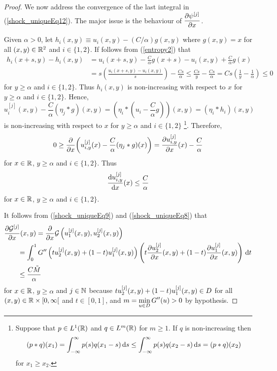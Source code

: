 \begin{proof}
 We now address the convergence of the last integral in
(\ref{shock_uniqueEq12}).  The major issue is the behaviour of
$\DS \pdydx{\psi^{[j]}}{x}$.

Given $\alpha > 0$, let $h_i(x,y) \equiv u_i(x,y) - (C/\alpha) g(x,y)$ where 
$g(x,y) = x$ for all $(x,y) \in \RR^2$ and $i \in\{1,2\}$.  If follows from
(\ref{entropy2}) that
\begin{align*}
h_i(x+s,y) - h_i(x,y)
&= u_i(x+s,y) - \frac{C}{\alpha} g(x+s)
- u_i(x,y) + \frac{C}{\alpha} g(x) \\
&= s\left( \frac{u_i(x+s,y) - u_i(x,y)}{s}\right) - \frac{C s}{\alpha}
\leq \frac{C s}{y} - \frac{C s}{\alpha}
= C s\left( \frac{1}{y} - \frac{1}{\alpha}\right) \leq 0
\end{align*}
for $y\geq \alpha$ and $i \in \{1,2\}$.  Thus $h_i(x,y)$ is non-increasing
with respect to $x$ for $y\geq \alpha$ and $i \in \{1,2\}$.  Hence,
\[
u_i^{[j]}(x,y) - \frac{C}{\alpha} (\eta_j \ast g)(x,y)
= \left(\eta_i \ast ( u_i- \frac{C}{\alpha} g)\right)(x,y)
= \left(\eta_i \ast h_i\right)(x,y)
\]
is non-increasing with respect to $x$ for $y \geq \alpha$ and
$i \in \{1,2\}$ \footnote{
Suppose that $p \in L^1(\RR)$ and $q \in L^m(\RR)$ for $m \geq 1$. 
If $q$ is non-increasing then
\[
(p\ast q)(x_1) = \int_{-\infty}^\infty p(s) q(x_1-s) \dx{s}
\leq \int_{-\infty}^\infty p(s) q(x_2-s) \dx{s}
= (p\ast q)(x_2)
\]
for $x_1 \geq x_2$.}.
Therefore,
\[
0 \geq \pdfdx{\left( u_{i,y}^{[j]}(x) - \frac{C}{\alpha} (\eta_j \ast g)(x)
\right)}{x}
= \pdydx{u_{i,y}^{[j]}}{x}(x) - \frac{C}{\alpha}
\]
for $x \in \RR$, $y\geq \alpha$ and $i \in \{1,2\}$.  Thus
\begin{equation} \label{shock_uniqueEq8}
 \dydx{u_{i,y}^{[j]}}{x}(x) \leq \frac{C}{\alpha}
\end{equation}
for $x \in \RR$, $y \geq \alpha$ and $i \in \{1,2\}$.

It follows from (\ref{shock_uniqueEq9}) and (\ref{shock_uniqueEq8}) that
\begin{align}
&\pdydx{{\cal G}^{[j]}}{x}(x,y)
= \pdfdx{ {\cal G}\left(u_1^{[j]}(x,y),u_2^{[j]}(x,y)\right)}{x} \nonumber \\
&\qquad
= \int_0^1 G''\left(t u_2^{[j]}(x,y) + (1-t) u_1^{[j]}(x,y)\right)
\left(t \pdydx{u_2^{[j]}}{x}(x,y) + (1-t) \pdydx{u_1^{[j]}}{x}(x,y) \right)
\dx{t} \nonumber \\
&\qquad \leq \frac{C \tilde{M}}{\alpha}   \label{shock_uniqueEq13}
\end{align}
for $x\in \RR$, $y \geq \alpha$ and $j\in \NN$ because
$\DS t u_2^{[j]}(x,y) + (1-t) u_1^{[j]}(x,y) \in D$
for all $(x,y) \in \RR \times[0,\infty[$ and $t \in [0,1]$, and
$\DS m = \min_{u \in D} G''(u) > 0$ by hypothesis.


\end{proof}
